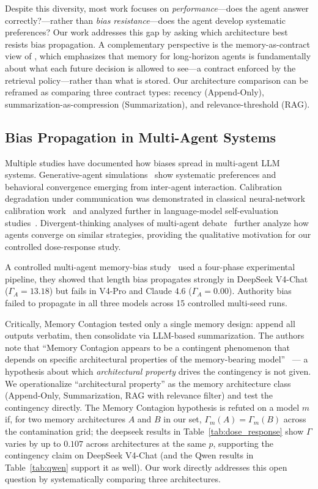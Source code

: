 \documentclass[11pt]{article}
\begin{document}
Despite this diversity, most work focuses on \emph{performance}---does the agent answer correctly?---rather than \emph{bias resistance}---does the agent develop systematic preferences? Our work addresses this gap by asking which architecture best resists bias propagation. A complementary perspective is the memory-as-contract view of \citet{cheng2026agenticsts}, which emphasizes that memory for long-horizon agents is fundamentally about what each future decision is allowed to see---a contract enforced by the retrieval policy---rather than what is stored. Our architecture comparison can be reframed as comparing three contract types: recency (Append-Only), summarization-as-compression (Summarization), and relevance-threshold (RAG).

\subsection{Bias Propagation in Multi-Agent Systems}

Multiple studies have documented how biases spread in multi-agent LLM systems. Generative-agent simulations~\cite{park2023generative} show systematic preferences and behavioral convergence emerging from inter-agent interaction. Calibration degradation under communication was demonstrated in classical neural-network calibration work~\cite{guo2017calibration} and analyzed further in language-model self-evaluation studies~\cite{kadavath2022language}. Divergent-thinking analyses of multi-agent debate~\cite{liang2023multiagent} further analyze how agents converge on similar strategies, providing the qualitative motivation for our controlled dose-response study.

A controlled multi-agent memory-bias study~\cite{bertalanic2026cost,huang2026cagecal} used a four-phase experimental pipeline, they showed that length bias propagates strongly in DeepSeek V4-Chat ($\Gamma_A = 13.18$) but fails in V4-Pro and Claude 4.6 ($\Gamma_A = 0.00$). Authority bias failed to propagate in all three models across 15 controlled multi-seed runs.

Critically, Memory Contagion tested only a single memory design: append all outputs verbatim, then consolidate via LLM-based summarization. The authors note that ``Memory Contagion appears to be a contingent phenomenon that depends on specific architectural properties of the memory-bearing model''~\cite{liu2026memorycontagion} --- a hypothesis about which \emph{architectural property} drives the contingency is not given. We operationalize ``architectural property'' as the memory architecture class (Append-Only, Summarization, RAG with relevance filter) and test the contingency directly. The Memory Contagion hypothesis is refuted on a model $m$ if, for two memory architectures $A$ and $B$ in our set, $\Gamma_m(A) = \Gamma_m(B)$ across the contamination grid; the deepseek results in Table~\ref{tab:dose_response} show $\Gamma$ varies by up to $0.107$ across architectures at the same $p$, supporting the contingency claim on DeepSeek V4-Chat (and the Qwen results in Table~\ref{tab:qwen} support it as well). Our work directly addresses this open question by systematically comparing three architectures.
\end{document}
